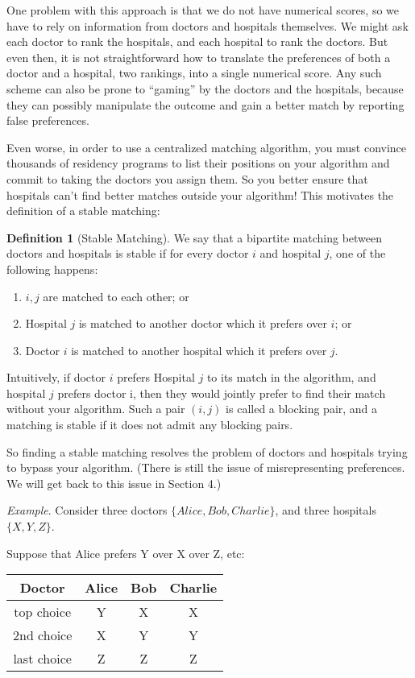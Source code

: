 \documentclass [12pt]{article}
\theoremstyle{definition}
\newtheorem{definition}{Definition}[section]
\begin{document}
One problem with this approach is that we do not have numerical scores, so we have to rely on information from doctors and hospitals themselves. We might ask each doctor to rank the hospitals, and each hospital to rank the doctors. But even then, it is not straightforward how to translate the preferences of both a doctor and a hospital, two rankings, into a single numerical score. Any such scheme can also be prone to ``gaming'' by the doctors and the hospitals, because they can possibly manipulate the outcome and gain a better match by reporting false preferences.

Even worse, in order to use a centralized matching algorithm, you must convince thousands of residency programs to list their positions on your algorithm and commit to taking the doctors you assign them. So you better ensure that hospitals can't find better matches outside your algorithm! This motivates the definition of a stable matching:

\begin{definition}[Stable Matching]
We say that a bipartite matching between doctors and hospitals is stable if for every doctor $i$ and hospital $j$, one of the following happens:
\begin{enumerate}
    \item $i, j$ are matched to each other; or
    \item Hospital $j$ is matched to another doctor which it prefers over $i$; or
    \item Doctor $i$ is matched to another hospital which it prefers over $j$.
\end{enumerate}
\end{definition}

Intuitively, if doctor $i$ prefers Hospital $j$ to its match in the algorithm, and hospital $j$ prefers doctor i, then they would jointly prefer to find their match without your algorithm. Such a pair $(i, j)$ is called a blocking pair, and a matching is stable if it does not admit any blocking pairs.

So finding a stable matching resolves the problem of doctors and hospitals trying to bypass your algorithm. (There is still the issue of misrepresenting preferences. We will get back to
this issue in Section 4.)

\textit{Example}\label{ex:2}. Consider three doctors $\{Alice,Bob,Charlie\}$, and three hospitals $\{X, Y, Z\}$.


Suppose that Alice prefers Y over X over Z, etc:

\begin{table}[!h]
\centering
\begin{tabular}{|c|c|c|c|}
\hline Doctor & Alice & Bob & Charlie \\
\hline top choice & Y & X & X \\
2nd choice & X & Y & Y \\
last choice & Z & Z & Z \\
\hline
\end{tabular}
\end{table}
\end{document}
